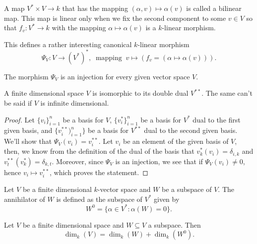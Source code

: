 \begin{definition}\label{def: bilinear map}
    A map \(V^\ast \times V \to k\) that has the mapping \((\alpha, v) \mapsto
    \alpha(v)\) is called a bilinear map. This map is linear only when we fix the
    second component to some \(v \in V\) so that \(f_v: V^\ast \to k\) with the
    mapping \(\alpha \mapsto \alpha(v)\) is a \(k\)-linear morphism.
\end{definition}

This defines a rather interesting canonical \(k\)-linear morphism
\[
    \Psi_V : V \to (V^\ast)^\ast,\
    \text{ mapping }\ v \mapsto (f_v = (\alpha \mapsto \alpha(v))).
\]

\begin{proposition}
    The morphism \(\Psi_V\) is an injection for every given vector space \(V\).
\end{proposition}

\begin{proposition}
    A finite dimensional space \(V\) is isomorphic to its double dual
    \(V^{\ast\ast}\). The same can't be said if \(V\) is infinite dimensional.
\end{proposition}

\begin{proof}
    Let \(\{v_i\}_{i=1}^n\) be a basis for \(V\), \(\{v_i^\ast\}_{i=1}^n\) be a
    basis for \(V^\ast\) dual to the first given basis, and
    \(\{v_i^{\ast\ast})_{i=1}^n\}\) be a basis for \(V^{\ast\ast}\) dual to the
    second given basis. We'll show that \(\Psi_V(v_i) = v_i^{\ast\ast}\). Let
    \(v_i\) be an element of the given basis of \(V\), then, we know from the
    definition of the dual of the basis that \(v_k^\ast(v_i) = \delta_{i, k}\) and
    \(v_t^{\ast\ast}(v_k^\ast) = \delta_{k, t}\).  Moreover, since \(\Psi_V\) is
    an injection, we see that if \(\Psi_V(v_i) \neq 0\), hence \(v_i \mapsto
    v_i^{\ast\ast}\), which proves the statement.
\end{proof}

\begin{definition}[Annihilator]\label{def: annihilator}
    Let \(V\) be a finite dimensional \(k\)-vector space and \(W\) be a subspace
    of \(V\). The annihilator of \(W\) is defined as the subspace of \(V^\ast\)
    given by
    \[
        W^0 = \{\alpha \in V^\ast \colon \alpha(W) = 0\}.
    \]
\end{definition}

\begin{proposition}
    Let \(V\) be a finite dimensional space and \(W \subseteq V\) a subspace. Then
    \[
        \dim_k(V) = \dim_k(W) + \dim_k(W^0).
    \]
\end{proposition}

